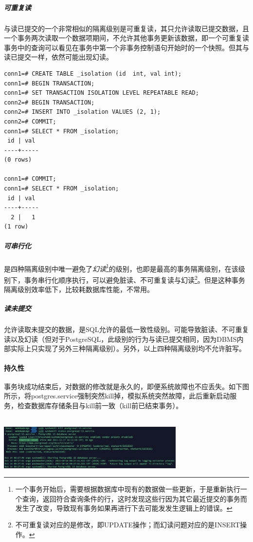 \subparagraph{可重复读} 与读已提交的一个非常相似的隔离级别是可重复读，其只允许读取已提交数据，且一个事务两次读取一个数据项期间，不允许其他事务更新该数据，即一个可重复读事务中的查询可以看见在事务中第一个非事务控制语句开始时的一个快照。但其与读已提交一样，依然可能出现幻读。
\begin{lstlisting}
conn1=# CREATE TABLE _isolation (id  int, val int);
conn1=# BEGIN TRANSACTION;
conn1=# SET TRANSACTION ISOLATION LEVEL REPEATABLE READ;
conn2=# BEGIN TRANSACTION;
conn2=# INSERT INTO _isolation VALUES (2, 1);
conn2=# COMMIT;
conn1=# SELECT * FROM _isolation;
 id | val 
----+-----
(0 rows)

conn1=# COMMIT;
conn1=# SELECT * FROM _isolation;
 id | val 
----+-----
  2 |   1
(1 row)
\end{lstlisting}
\vspace{-2em}

\subparagraph{可串行化} 是四种隔离级别中唯一避免了\emph{幻读}\footnote{一个事务开始后，需要根据数据库中现有的数据做一些更新，于是重新执行一个查询，返回符合查询条件的行，这时发现这些行因为其它最近提交的事务而发生了改变，导致现有事务如果再进行下去可能发发生逻辑上的错误。}的级别，也即是最高的事务隔离级别，在该级别下，事务串行化顺序执行，可以避免脏读、不可重复读与幻读\footnote{不可重复读对应的是修改，即UPDATE操作；而幻读问题对应的是INSERT操作。}。但是这种事务隔离级别效率低下，比较耗数据库性能，不常用。

\subparagraph{读未提交} 允许读取未提交的数据，是SQL允许的最低一致性级别。可能导致脏读、不可重复读以及幻读（但对于PostgreSQL，此级别的行为与读已提交相同，因为DBMS内部实际上只实现了另外三种隔离级别）。另外，以上四种隔离级别均不允许脏写。


\paragraph{持久性} 事务块成功结束后，对数据的修改就是永久的，即便系统故障也不应丢失。如下图所示，将postgres.service强制突然kill掉，模拟系统突然故障，此后重新启动服务，检查数据库存储条目与kill前一致（kill前已结束事务）。\\~\\
\centerline{\includegraphics[width=0.7\textwidth]{sp/kill}}
